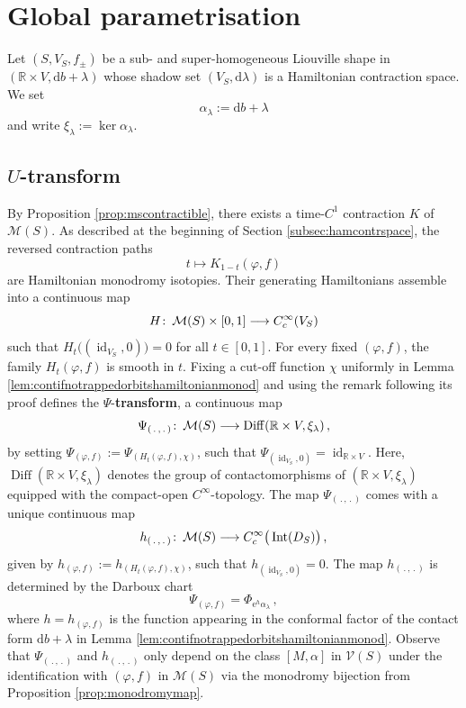 \documentclass{amsart}
\theoremstyle{definition}
\def\co{\colon\thinspace}
\newcommand{\rmd}{\mathrm d}
\newcommand{\rme}{\mathrm e}
\newcommand{\MM}{\mathcal M}
\newcommand{\R}{\mathbb R}
\newcommand{\VV}{\mathcal V}
\newcommand{\lra}{\longrightarrow}
\DeclareMathOperator{\Diff}{\mathrm{Diff}}
\DeclareMathOperator{\id}{\mathrm{id}}
\DeclareMathOperator{\Int}{\mathrm{Int}}
\begin{document}
\section{Global parametrisation\label{sec:globparam}}

Let $(S,V_S,f_{\pm})$ be a sub- and super-homogeneous
Liouville shape in $(\R\times V,\rmd b+\lambda)$
whose shadow set $(V_S,\rmd\lambda)$
is a Hamiltonian contraction space.
We set
\[
\alpha_{\lambda}:=\rmd b+\lambda
\]
and write $\xi_{\lambda}:=\ker\alpha_{\lambda}$.



\subsection{\texorpdfstring{$U$}{U}-transform}
\label{subsec:utransform}


By Proposition \ref{prop:mscontractible},
there exists a time-$C^1$ contraction $K$ of $\MM(S)$.
As described at the beginning of
Section \ref{subsec:hamcontrspace},
the reversed contraction paths
\[
t\longmapsto K_{1-t}(\varphi,f)
\]
are Hamiltonian monodromy isotopies.
Their generating Hamiltonians assemble into
a continuous map
\[
H\co\MM(S)\times[0,1]
\lra C_c^{\infty}(V_S)
\]
such that
$H_t\big((\id_{V_S},0)\big)=0$
for all $t\in[0,1]$.
For every fixed $(\varphi,f)$,
the family $H_t(\varphi,f)$ is smooth in $t$.
Fixing a cut-off function $\chi$ uniformly
in Lemma \ref{lem:contifnotrappedorbitshamiltonianmonod}
and using the remark following its proof
defines the $\Psi$-{\bf transform},
a continuous map
\[
\Psi_{(\,.\,,\,.\,)}\co
\MM(S)\lra\Diff(\R\times V,\xi_{\lambda})
\,,
\]
by setting
$
\Psi_{(\varphi,f)}:=
\Psi_{(H_t(\varphi,f),\chi)}
$,
such that $\Psi_{(\id_{V_S},0)}=\id_{\R\times V}$.
Here,
$\Diff(\R\times V,\xi_{\lambda})$
denotes the group of contactomorphisms of
$(\R\times V,\xi_{\lambda})$
equipped with the compact-open
$C^\infty$-topology.
The map $\Psi_{(\,.\,,\,.\,)}$
comes with a unique continuous map
\[
h_{(\,.\,,\,.\,)}\co
\MM(S)\lra C_c^{\infty}\big(\Int(D_S)\big)
\,,
\]
given by
$
h_{(\varphi,f)}:=
h_{(H_t(\varphi,f),\chi)}
$,
such that $h_{(\id_{V_S},0)}=0$.
The map $h_{(\,.\,,\,.\,)}$
is determined by the Darboux chart
\[
\Psi_{(\varphi,f)}=\Phi_{\rme^h\alpha_{\lambda}}
\,,
\]
where $h=h_{(\varphi,f)}$ is the function appearing
in the conformal factor of the contact form $\rmd b+\lambda$
in Lemma \ref{lem:contifnotrappedorbitshamiltonianmonod}.
Observe that $\Psi_{(\,.\,,\,.\,)}$ and $h_{(\,.\,,\,.\,)}$
only depend on the class $[M,\alpha]$ in $\VV(S)$
under the identification with $(\varphi,f)$ in $\MM(S)$
via the monodromy bijection
from Proposition \ref{prop:monodromymap}.
\end{document}
